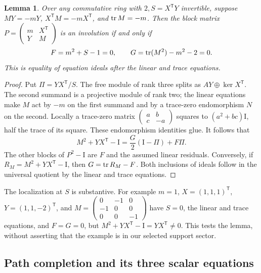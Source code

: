 \documentclass[11pt,a4paper]{article}
\newtheorem{lemma}[theorem]{Lemma}\newtheorem{proposition}[theorem]{Proposition}
\theoremstyle{remark}\newtheorem{remark}[theorem]{Remark}
\newcommand{\Id}{\mathrm I}\newcommand{\F}{\mathbb F}
\begin{document}
\begin{lemma}\label{geometry:blockcriterion}
Over any commutative ring with \(2,S=X^{\mathsf T}Y\) invertible, suppose
\(MY=-mY\), \(X^{\mathsf T}M=-mX^{\mathsf T}\), and
\(\operatorname{tr} M=-m\). Then the block matrix
\(P=\left(\begin{smallmatrix}m&X^{\mathsf T}\\Y&M\end{smallmatrix}\right)\)
is an involution if and only if
\[
 F=m^2+S-1=0,\qquad G=\operatorname{tr}(M^2)-m^2-2=0.
\]
This is equality of equation ideals after the linear and trace equations.
\end{lemma}
\begin{proof}
Put \(\Pi=YX^{\mathsf T}/S\). The free module of rank three splits
as \(AY\oplus\ker X^{\mathsf T}\). The second summand is a projective
module of rank two; the linear equations make \(M\) act by \(-m\) on
the first summand and by a trace-zero endomorphism \(N\) on the second.
Locally a trace-zero matrix
\(\left(\begin{smallmatrix}a&b\\c&-a\end{smallmatrix}\right)\)
squares to \((a^2+bc)\Id\), half the trace of its square.
These endomorphism identities glue. It follows that
\begin{equation}\label{geometry:blockresidual}
 M^2+YX^{\mathsf T}-\Id=\frac G2(\Id-\Pi)+F\Pi.
\end{equation}
The other blocks of \(P^2-\Id\) are \(F\) and the assumed linear
residuals. Conversely, if \(R_M=M^2+YX^{\mathsf T}-\Id\), then
\(G=\operatorname{tr} R_M-F\). Both inclusions of ideals follow in the universal
quotient by the linear and trace equations.
\end{proof}

The localization at \(S\) is substantive. For example
\(m=1\), \(X=(1,1,1)^{\mathsf T}\), \(Y=(1,1,-2)^{\mathsf T}\),
and
\(M=\left(\begin{smallmatrix}0&-1&0\\-1&0&0\\0&0&-1\end{smallmatrix}\right)\)
have \(S=0\), the linear and trace equations, and \(F=G=0\), but
\(M^2+YX^{\mathsf T}-\Id=YX^{\mathsf T}\ne0\).
This tests the lemma, without asserting that the example is in our
selected support sector.

\subsection{Path completion and its three scalar equations}
\end{document}

